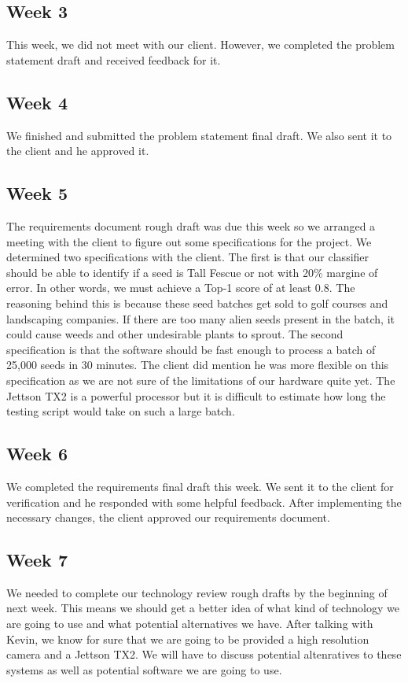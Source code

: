 \documentclass[onecolumn, draftclsnofoot,10pt, compsoc]{IEEEtran}
\begin{document}
	\subsection{Week 3}
	This week, we did not meet with our client. However, we completed the problem statement draft and received feedback for it. 
	\subsection{Week 4}
	We finished and submitted the problem statement final draft. We also sent it to the client and he approved it. 
	\subsection{Week 5}
	The requirements document rough draft was due this week so we arranged a meeting with the client to figure out some specifications for the project. We determined two specifications with the client. The first is that our classifier should be able to identify if a seed is Tall Fescue or not with 20\% margine of error. In other words, we must achieve a Top-1 score of at least 0.8. The reasoning behind this is because these seed batches get sold to golf courses and landscaping companies. If there are too many alien seeds present in the batch, it could cause weeds and other undesirable plants to sprout. The second specification is that the software should be fast enough to process a batch of 25,000 seeds in 30 minutes. The client did mention he was more flexible on this specification as we are not sure of the limitations of our hardware quite yet. The Jettson TX2 is a powerful processor but it is difficult to estimate how long the testing script would take on such a large batch.
	\subsection{Week 6}
	We completed the requirements final draft this week. We sent it to the client for verification and he responded with some helpful feedback. After implementing the necessary changes, the client approved our requirements document.
	\subsection{Week 7}
	We needed to complete our technology review rough drafts by the beginning of next week. This means we should get a better idea of what kind of technology we are going to use and what potential alternatives we have. After talking with Kevin, we know for sure that we are going to be provided a high resolution camera and a Jettson TX2. We will have to discuss potential altenratives to these systems as well as potential software we are going to use. 
\end{document}
